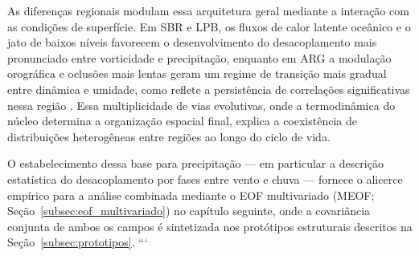 As diferenças regionais modulam essa arquitetura geral mediante a interação com as condições de superfície.
Em SBR e LPB, os fluxos de calor latente oceânico e o jato de baixos níveis favorecem o desenvolvimento do desacoplamento mais pronunciado entre vorticidade e precipitação, enquanto em ARG a modulação orográfica e oclusões mais lentas geram um regime de transição mais gradual entre dinâmica e umidade, como reflete a persistência de correlações significativas nessa região \citep{marrafon2022classificacao}.
Essa multiplicidade de vias evolutivas, onde a termodinâmica do núcleo determina a organização espacial final, explica a coexistência de distribuições heterogêneas entre regiões ao longo do ciclo de vida.

O estabelecimento dessa base para precipitação --- em particular a descrição estatística do desacoplamento por fases entre vento e chuva --- fornece o alicerce empírico para a análise combinada mediante o EOF multivariado (MEOF; Seção~\ref{subsec:eof_multivariado}) no capítulo seguinte, onde a covariância conjunta de ambos os campos é sintetizada nos protótipos estruturais descritos na Seção~\ref{subsec:prototipos}.
```